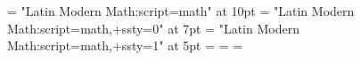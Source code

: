 %
\ifdefined\mathfontname\else
  \gdef\mathfontname{Latin Modern Math}
\fi
\chardef{} %
\font   \tenmath = "\mathfontname:script=math" at 10pt
\font \sevenmath = "\mathfontname:script=math,+ssty=0" at 7pt
\font  \fivemath = "\mathfontname:script=math,+ssty=1" at 5pt
\textfont         \unimathfam =   \tenmath
\scriptfont       \unimathfam = \sevenmath
\scriptscriptfont \unimathfam =  \fivemath

